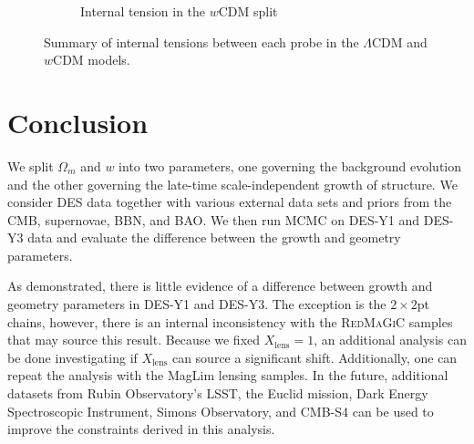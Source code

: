 \begin{figure}[ht]
\begin{subfigure}[b]{0.45\textwidth}
		\caption{Internal tension in the $w$CDM split}
		\label{fig:wcdm_tension}
	\end{subfigure}
	\caption{Summary of internal tensions between each probe in the $\Lambda$CDM and $w$CDM models.}
	\label{fig:tension}
\end{figure}
\section{Conclusion}
We split $\Omega_m$ and $w$ into two parameters, one governing the background evolution and the other governing the late-time scale-independent growth of structure. We consider DES data together with various external data sets and priors from the CMB, supernovae, BBN, and BAO. We then run MCMC on DES-Y1 and DES-Y3 data and evaluate the difference between the growth and geometry parameters. 

As demonstrated, there is little evidence of a difference between growth and geometry parameters in DES-Y1 and DES-Y3. The exception is the $2\times2$pt chains, however, there is an internal inconsistency with the \textsc{RedMaGiC} samples that may source this result. Because we fixed $X_\mathrm{lens}=1$, an additional analysis can be done investigating if $X_{\mathrm{lens}}$ can source a significant shift. Additionally, one can repeat the analysis with the MagLim lensing samples. In the future, additional datasets from Rubin Observatory's LSST, the Euclid mission, Dark Energy Spectroscopic Instrument, Simons Observatory, and CMB-S4 can be used to improve the constraints derived in this analysis.
